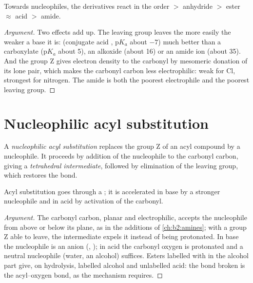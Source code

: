 \begin{proposition}\label{prop:b2:acyl-substitution:reactivity}
Towards nucleophiles, the derivatives react in the order  $>$ anhydride $>$ ester
$\approx$ acid $>$ amide.
\end{proposition}

\begin{proof}[Argument]
Two effects add up. The leaving group  leaves the more easily the weaker a base it is:
 (conjugate acid , $\mathrm pK_a$ about $-7$) much better than a carboxylate
($\mathrm pK_a$ about 5), an alkoxide (about 16) or an amide ion (about 35). And the group Z gives
electron density to the carbonyl by mesomeric donation of its lone pair, which makes the carbonyl
carbon less electrophilic: weak for Cl, strongest for nitrogen. The amide is both the poorest
electrophile and the poorest leaving group.
\end{proof}

\section{Nucleophilic acyl substitution}

\begin{definition}\label{def:b2:acyl-substitution:nas}
A \emph{nucleophilic acyl substitution} replaces the group Z
of an acyl compound by a nucleophile. It proceeds by addition of the nucleophile to the carbonyl
carbon, giving a \emph{tetrahedral intermediate}, followed by
elimination of the leaving group, which restores the  bond.
\end{definition}

\begin{proposition}\label{prop:b2:acyl-substitution:addition-elimination}
Acyl substitution goes through a ; it is accelerated in base by a stronger
nucleophile and in acid by activation of the carbonyl.
\end{proposition}

\begin{proof}[Argument]
The carbonyl carbon, planar and electrophilic, accepts the nucleophile from above or below its
plane, as in the additions of \cref{ch:b2:amines}; with a group Z able to leave, the intermediate
expels it instead of being protonated. In base the nucleophile is an anion (,
); in acid the carbonyl oxygen is protonated and a neutral nucleophile (water, an alcohol)
suffices. Esters labelled with  in the alcohol part give, on hydrolysis, labelled alcohol
and unlabelled acid: the bond broken is the acyl--oxygen bond, as the mechanism requires.
\end{proof}

